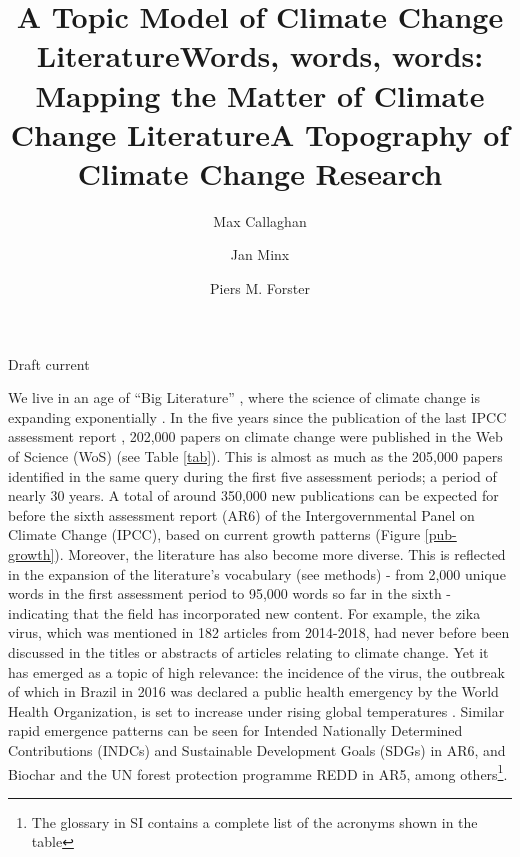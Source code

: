 \documentclass{article}
\title{A Topic Model of Climate Change Literature}
\title{Words, words, words: Mapping the Matter of Climate Change Literature}
\title{A Topography of Climate Change Research}
\author[1,2]{Max Callaghan}
\author[1,2]{Jan Minx}
\author[2]{Piers M. Forster}
\affil[1]{Mercator Research Institute on Global Commons and Climate Change, Torgauer Straße, 10829 Berlin, Germany}
\affil[2]{Priestley International Centre for Climate, University of Leeds, Leeds LS2 9JT, United Kingdom}
\makeatletter
\renewcommand{\maketitle}{\bgroup\setlength{\parindent}{0pt}
	\begin{flushleft}
		
		{\huge\textbf{\@title}}
		
		\bigskip
		
		{\large\textbf{\@author}}
		
		\bigskip
		
		{\large{Draft current \@date}}
		
	\end{flushleft}\egroup
}
\makeatother
\begin{document}
	\maketitle
	
	
	\begin{linenumbers}
		
		\noindent\textbf{}
		
		
		
		\bigskip
		
		\noindent We live in an age of ``Big Literature'' 
		\cite{Nunez-Mir2016, Minx2017l}, where the science of climate change is expanding exponentially \cite{Grieneisen2011, Haunschild2016}. In the five years since the publication of the last IPCC assessment report \cite{IPCC2014c}, 202,000 papers on climate change were published in the Web of Science (WoS) (see Table \ref{tab}). This is almost as much as the 205,000 papers identified in the same query \cite{Grieneisen2011} during the first five assessment periods; a period of nearly 30 years. A total of around 350,000 new publications can be expected for before the sixth assessment report (AR6) of the Intergovernmental Panel on Climate Change (IPCC), based on current growth patterns (Figure \ref{pub-growth}). Moreover, the literature has also become more diverse. This is reflected in the expansion of the literature's vocabulary (see methods) - from 2,000 unique words in the first assessment period to 95,000 words so far in the sixth - indicating that the field has incorporated new content. For example, the zika virus, which was mentioned in 182 articles from 2014-2018, had never before been discussed in the titles or abstracts of articles relating to climate change. Yet it has emerged as a topic of high relevance: the incidence of the virus, the outbreak of which in Brazil in 2016 was declared a public health emergency by the World Health Organization, is set to increase under rising global temperatures \cite{Rao2019}. Similar rapid emergence patterns can be seen for Intended Nationally Determined Contributions (INDCs) and Sustainable Development Goals (SDGs) in AR6, and Biochar and the UN forest protection programme REDD in AR5, among others\footnote{The glossary in SI contains a complete list of the acronyms shown in the table}.
		

\end{linenumbers}
\end{document}

